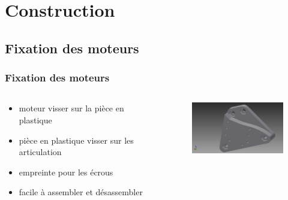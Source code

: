 \section{Construction}

\subsection{Fixation des moteurs}
\begin{frame}
  \frametitle{Fixation des moteurs}
  \begin{columns}[c]
    \begin{column}[T]{.5\textwidth}
      \begin{itemize}
        \item moteur visser sur la pièce en plastique
        \item pièce en plastique visser sur les articulation
        \item empreinte pour les écrous
        \item facile à assembler et désassembler
      \end{itemize}
    \end{column}
    \begin{column}[T]{.5\textwidth}  
      \begin{figure}
        			\includegraphics[width=5cm]{../img/part_middle_v1.jpg}
      \end{figure}
    \end{column}
  \end{columns}
\end{frame}

